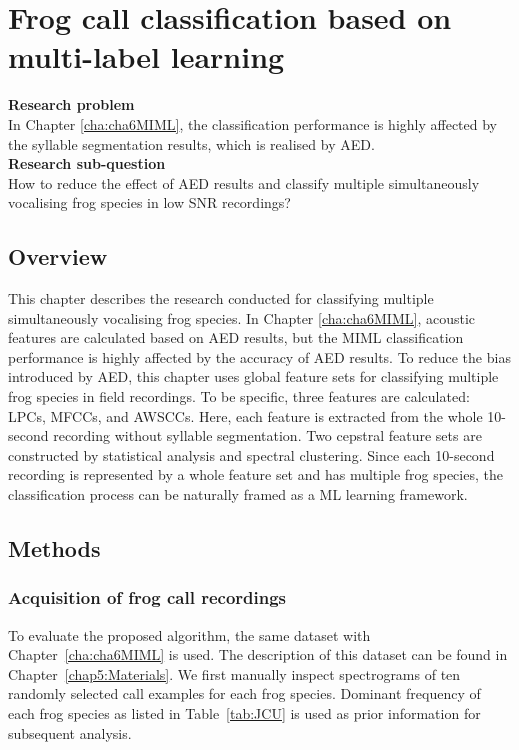 
\chapter{Frog call classification based on multi-label learning}
\label{cha:cha7ML}
\textbf{Research problem}
\\
In Chapter \ref{cha:cha6MIML}, the classification performance is highly affected by the syllable segmentation results, which is realised by AED. 
\\
\textbf{Research sub-question}
\\
How to reduce the effect of AED results and classify multiple simultaneously vocalising frog species in low SNR recordings?


\section{Overview}
\label{sect:introduction}

This chapter describes the research conducted for classifying multiple simultaneously vocalising frog species. In Chapter \ref{cha:cha6MIML}, acoustic features are calculated based on AED results, but the MIML classification performance is highly affected by the accuracy of AED results. To reduce the bias introduced by AED, this chapter uses global feature sets for classifying multiple frog species in field recordings.
To be specific, three features are calculated: LPCs, MFCCs, and AWSCCs. Here, each feature is extracted from the whole 10-second recording without syllable segmentation. Two cepstral feature sets are constructed by statistical analysis and spectral clustering. Since each 10-second recording is represented by a whole feature set and has multiple frog species, the classification process can be naturally framed as a ML learning framework.  


\section{Methods}

\subsection{Acquisition of frog call recordings}

To evaluate the proposed algorithm, the same dataset with Chapter~\ref{cha:cha6MIML} is used. The description of this dataset can be found in Chapter~\ref{chap5:Materials}. We first manually inspect spectrograms of ten randomly selected call examples for each frog species. Dominant frequency of each frog species as listed in Table~\ref{tab:JCU} is used as prior information for subsequent analysis.



